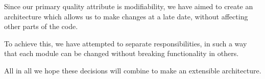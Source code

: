 Since our primary quality attribute is modifiability, we have aimed to create 
an architecture which allows us to make changes at a late date, without
affecting other parts of the code.

To achieve this, we have attempted to separate responsibilities, in such a way
that each module can be changed without breaking functionality in others.
 
All in all we hope these decisions will combine to make an extensible architecture.